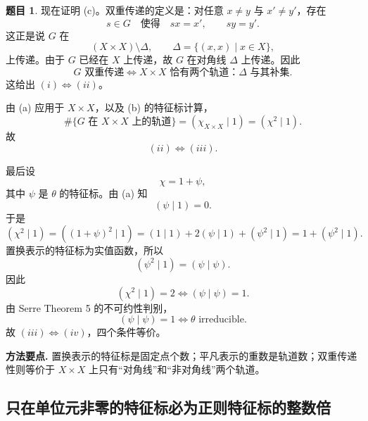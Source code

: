 \documentclass[a4paper]{ctexart}
\theoremstyle{definition}
\newtheorem{example}{题目}[section]
\theoremstyle{analysis}
\theoremstyle{plain}
\begin{document}
\begin{example}
现在证明 (c)。双重传递的定义是：对任意 \(x\ne y\) 与 \(x'\ne y'\)，存在
\[
  s\in G
  \quad\text{使得}\quad
  sx=x',
  \qquad
  sy=y'.
\]
这正是说 \(G\) 在
\[
  (X\times X)\setminus \Delta,
  \qquad
  \Delta=\{(x,x)\mid x\in X\},
\]
上传递。由于 \(G\) 已经在 \(X\) 上传递，故 \(G\) 在对角线 \(\Delta\) 上传递。因此
\[
  G\text{ 双重传递}
  \Longleftrightarrow
  X\times X\text{ 恰有两个轨道：}\Delta\text{ 与其补集}.
\]
这给出 \((i)\Longleftrightarrow(ii)\)。

由 (a) 应用于 \(X\times X\)，以及 (b) 的特征标计算，
\[
  \#\{G\text{ 在 }X\times X\text{ 上的轨道}\}
  =
  (\chi_{X\times X}\mid 1)
  =
  (\chi^2\mid 1).
\]
故
\[
  (ii)\Longleftrightarrow(iii).
\]

最后设
\[
  \chi=1+\psi,
\]
其中 \(\psi\) 是 \(\theta\) 的特征标。由 (a) 知
\[
  (\psi\mid 1)=0.
\]
于是
\[
  (\chi^2\mid 1)
  =
  ((1+\psi)^2\mid 1)
  =
  (1\mid 1)+2(\psi\mid 1)+(\psi^2\mid 1)
  =
  1+(\psi^2\mid 1).
\]
置换表示的特征标为实值函数，所以
\[
  (\psi^2\mid 1)=(\psi\mid\psi).
\]
因此
\[
  (\chi^2\mid 1)=2
  \Longleftrightarrow
  (\psi\mid\psi)=1.
\]
由 Serre Theorem 5 的不可约性判别，
\[
  (\psi\mid\psi)=1
  \Longleftrightarrow
  \theta\text{ irreducible}.
\]
故 \((iii)\Longleftrightarrow(iv)\)，四个条件等价。

\textbf{方法要点.}
置换表示的特征标是固定点个数；平凡表示的重数是轨道数；双重传递性则等价于 \(X\times X\) 上只有“对角线”和“非对角线”两个轨道。
\end{example}

\subsection{只在单位元非零的特征标必为正则特征标的整数倍}
\label{subsec:problem-serre-regular-character-multiple}
\end{document}
